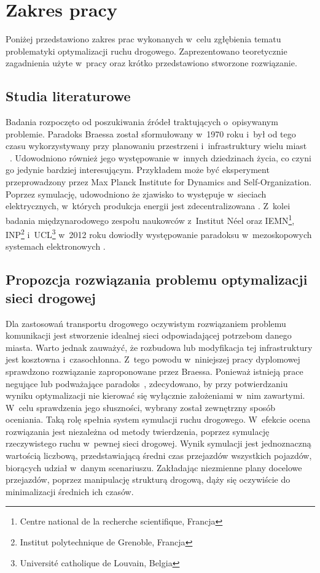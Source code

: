 \documentclass[twoside,12pt]{report}
\begin{document}
\section{Zakres pracy}
Poniżej przedstawiono zakres prac wykonanych w~celu zgłębienia tematu problematyki optymalizacji ruchu drogowego. Zaprezentowano teoretycznie zagadnienia użyte w~pracy oraz krótko przedstawiono stworzone rozwiązanie. 

\subsection{Studia literaturowe}
Badania rozpoczęto od poszukiwania źródeł traktujących o~opisywanym problemie. Paradoks Braessa został sformułowany w~1970 roku i~był od tego czasu wykorzystywany przy planowaniu przestrzeni i~infrastruktury wielu miast ~\cite{urban}. Udowodniono również jego występowanie w~innych dziedzinach życia, co czyni go jedynie bardziej interesującym. Przykładem może być eksperyment przeprowadzony przez Max Planck Institute for Dynamics and Self-Organization. Poprzez symulację, udowodniono że zjawisko to występuje w~sieciach elektrycznych, w~których produkcja energii jest zdecentralizowana \cite{elektrony}. Z~kolei badania międzynarodowego zespołu naukowców z~Institut Néel oraz IEMN\footnote{Centre national de la recherche scientifique, Francja}, INP\footnote{Institut polytechnique de Grenoble, Francja} i~UCL\footnote{Université catholique de Louvain, Belgia} w~2012 roku dowiodły występowanie paradoksu w~mezoskopowych systemach elektronowych \cite{nanoskopia}. 

\subsection{Propozcja rozwiązania problemu optymalizacji sieci drogowej}
Dla zastosowań transportu drogowego oczywistym rozwiązaniem problemu komunikacji jest stworzenie idealnej sieci odpowiadającej potrzebom danego miasta. Warto jednak zauważyć, że rozbudowa lub modyfikacja tej infrastruktury jest kosztowna i~czasochłonna.  Z~tego powodu w~niniejszej pracy dyplomowej sprawdzono rozwiązanie zaproponowane przez Braessa. Ponieważ istnieją prace negujące lub podważające paradoks~\cite{newinsights}, zdecydowano, by przy potwierdzaniu wyniku optymalizacji nie kierować się wyłącznie założeniami w~nim zawartymi. W~celu sprawdzenia jego słuszności, wybrany został zewnętrzny sposób oceniania. Taką rolę spełnia system symulacji ruchu drogowego. W~efekcie ocena rozwiązania jest niezależna od metody twierdzenia, poprzez symulację rzeczywistego ruchu w~pewnej sieci drogowej. Wynik symulacji jest jednoznaczną wartością liczbową, przedstawiającą średni czas przejazdów wszystkich pojazdów, biorących udział w~danym scenariuszu. Zakładając niezmienne plany docelowe przejazdów, poprzez manipulację strukturą drogową, dąży się oczywiście do minimalizacji średnich ich czasów.
\end{document}
